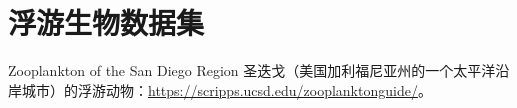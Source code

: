 \section{浮游生物数据集}

Zooplankton of the San Diego Region 圣迭戈（美国加利福尼亚州的一个太平洋沿岸城市）的浮游动物：\url{https://scripps.ucsd.edu/zooplanktonguide/}。